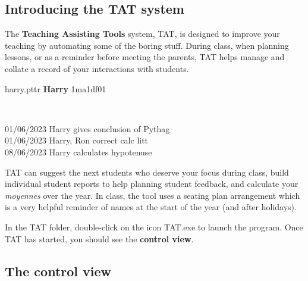 \documentclass[10pt]{article}
\begin{document}
\subsection{Introducing the TAT system}
The \textbf{Teaching Assisting Tools} system, TAT, is designed to improve your teaching by automating some of the boring stuff. During class, when planning lessons, or as a reminder before meeting the parents, TAT helps manage and collate a record of your interactions with students.

\begin{center}
\begin{tcolorbox}

harry.pttr \hfill \textbf{Harry} \hfill 1ma1df01

\

\small{
01/06/2023 Harry gives conclusion of Pythag \\
01/06/2023 Harry, Ron correct calc litt \\
08/06/2023 Harry calculates hypotenuse
}

\vspace{10mm}

\begin{center}
\end{center}

\end{tcolorbox}
\end{center}

TAT can suggest the next students who deserve your focus during class, build individual student reports to help planning student feedback, and calculate your \emph{moyennes} over the year. In class, the tool uses a seating plan arrangement which is a very helpful reminder of names at the start of the year (and after holidays).

In the TAT folder, double-click on the icon TAT.exe to launch the program. Once TAT has started, you should see the \textbf{control view}.

\subsection{The control view}
\end{document}
